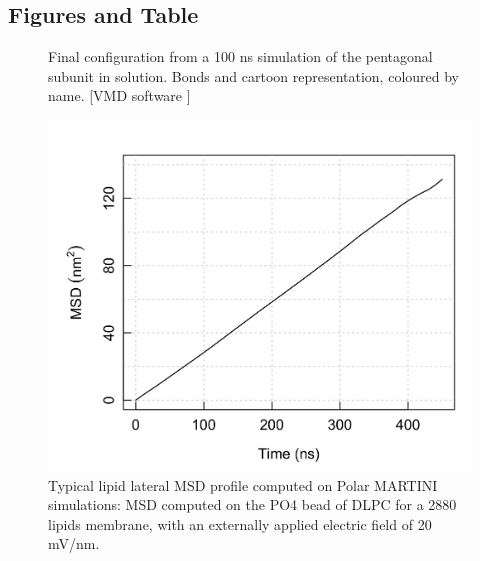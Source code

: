 \clearpage

\subsection{Figures and Table}
\begin{figure}[h!]
\centering
\caption[Final configuration of a pentagonal subunit simulation]{Final configuration from a 100 ns simulation of the pentagonal subunit in solution. Bonds and cartoon representation, coloured by name. [VMD software \citet{HUMP96}]}
\label{fig:penta_results_SI}
\end{figure}

\begin{figure}[h!]
\centering
\includegraphics[width=0.6\linewidth]{3results_capsule/pics/msd_MARTINI.png}
\caption[Typical lipid lateral MSD profile computed on Polar MARTINI simulations.]{Typical lipid lateral MSD profile computed on Polar MARTINI simulations: MSD computed on the PO4 bead of DLPC for a 2880 lipids membrane, with an externally applied electric field of 20 mV/nm.}
\label{fig:fig:MSD_martini}
\end{figure}

